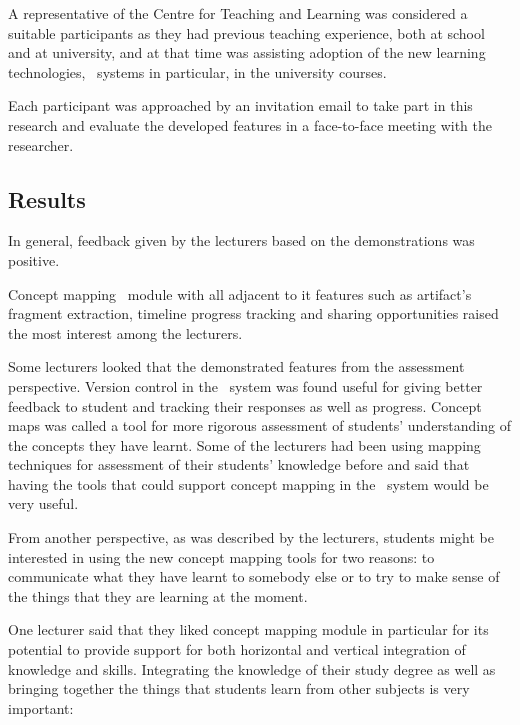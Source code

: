 A representative of the Centre for Teaching and Learning was considered a
suitable participants as they had previous teaching experience, both at school
and at university, and at that time was assisting adoption of the new learning
technologies, \ep~systems in particular, in the university courses.

Each participant was approached by an invitation email to take part in this
research and evaluate the developed features in a face-to-face meeting with the
researcher.

\subsection{Results}
\label{sec:study1results}

In general, feedback given by the lecturers based on the demonstrations was
positive.

Concept mapping \ep~module with all adjacent to it features such as
artifact's fragment extraction, timeline progress tracking and sharing
opportunities raised the most interest among the lecturers.

Some lecturers looked that the demonstrated features from the assessment
perspective. Version control in the \ep~system was found useful for giving
better feedback to student and tracking their responses as well as progress.
Concept maps was called a tool for more rigorous assessment of students'
understanding of the concepts they have learnt. Some of the lecturers had been
using mapping techniques for assessment of their students' knowledge before and
said that having the tools that could support concept mapping in the \ep~system
would be very useful.

From another perspective, as was described by the lecturers, students might
be interested in using the new concept mapping tools for two reasons: to
communicate what they have learnt to somebody else or to try to make sense of
the things that they are learning at the moment.

One lecturer said that they liked concept mapping module in particular for its
potential to provide support for both horizontal and vertical integration of
knowledge and skills. Integrating the knowledge of their study degree as well as 
bringing together the things that students learn from other subjects is very
important:


